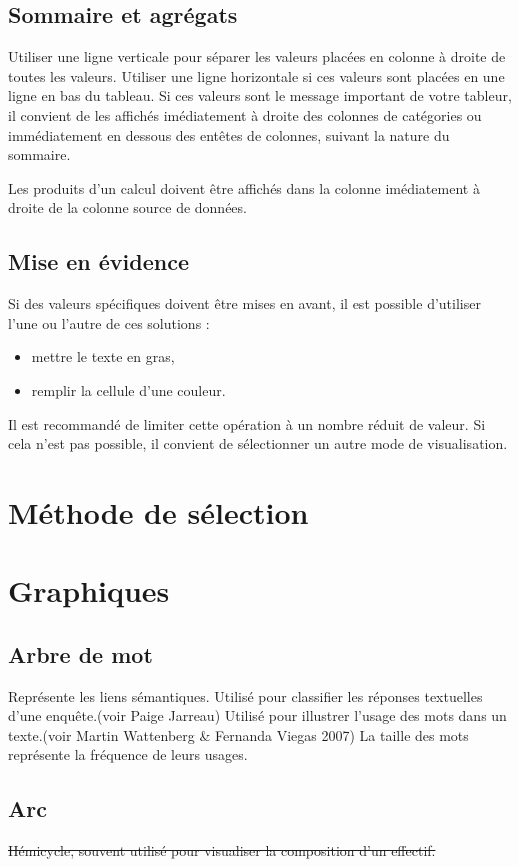 \documentclass[a4paper,12pt]{article}
\begin{document}
\begin{multicols}{2}
\subsection*{Sommaire et agrégats}
\label{sec:org9a5bc92}
Utiliser une ligne verticale pour séparer les valeurs placées en colonne à droite de toutes les valeurs.
Utiliser une ligne horizontale si ces valeurs sont placées en une ligne en bas du tableau.
Si ces valeurs sont le message important de votre tableur, il convient de les affichés imédiatement à droite des colonnes de catégories ou immédiatement en dessous des entêtes de colonnes, suivant la nature du sommaire.

Les produits d'un calcul doivent être affichés dans la colonne imédiatement à droite de la colonne source de données.
\subsection*{Mise en évidence}
\label{sec:org5fa6b34}
Si des valeurs spécifiques doivent être mises en avant, il est possible d'utiliser l'une ou l'autre de ces solutions :
\begin{itemize}
\item mettre le texte en gras,
\item remplir la cellule d'une couleur.
\end{itemize}
Il est recommandé de limiter cette opération à un nombre réduit de valeur. Si cela n'est pas possible, il convient de sélectionner un autre mode de visualisation.
\section*{Méthode de sélection}
\label{sec:org681cdfb}

\section*{Graphiques}
\label{sec:org05b6fc6}
\subsection*{Arbre de mot}
\label{sec:orgb88cce4}
Représente les liens sémantiques. Utilisé pour classifier les réponses textuelles d'une enquête.(voir Paige Jarreau) Utilisé pour illustrer l'usage des mots dans un texte.(voir Martin Wattenberg \& Fernanda Viegas 2007) La taille des mots représente la fréquence de leurs usages. \autocite{jonathanschwabishQualitative2021}
\subsection*{Arc}
\label{sec:orgd7073ce}
\sout{Hémicycle, souvent utilisé pour visualiser la composition d'un effectif.}

\end{multicols}
\end{document}
